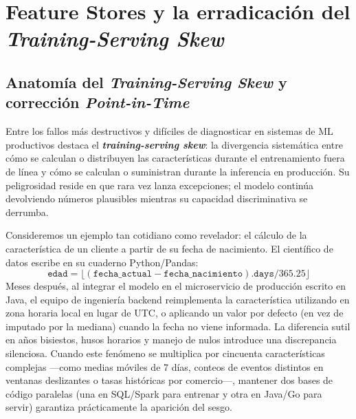 \section[Feature Stores y Training-Serving Skew]{Feature Stores y la erradicación del \textit{Training-Serving Skew}}\label{sec:mlops-feature-stores}

\subsection{Anatomía del \textit{Training-Serving Skew} y corrección \textit{Point-in-Time}}

Entre los fallos más destructivos y difíciles de diagnosticar en sistemas de ML productivos destaca el \textbf{\textit{training-serving skew}}: la divergencia sistemática entre cómo se calculan o distribuyen las características durante el entrenamiento fuera de línea y cómo se calculan o suministran durante la inferencia en producción. Su peligrosidad reside en que rara vez lanza excepciones; el modelo continúa devolviendo números plausibles mientras su capacidad discriminativa se derrumba.

Consideremos un ejemplo tan cotidiano como revelador: el cálculo de la característica  de un cliente a partir de su fecha de nacimiento. El científico de datos escribe en su cuaderno Python/Pandas:
\[
\texttt{edad} = \lfloor (\texttt{fecha\_actual} - \texttt{fecha\_nacimiento}).\texttt{days} / 365.25 \rfloor
\]
Meses después, al integrar el modelo en el microservicio de producción escrito en Java, el equipo de ingeniería backend reimplementa la característica utilizando  en zona horaria local en lugar de UTC, o aplicando un valor por defecto  (en vez de  imputado por la mediana) cuando la fecha no viene informada. La diferencia sutil en años bisiestos, husos horarios y manejo de nulos introduce una discrepancia silenciosa. Cuando este fenómeno se multiplica por cincuenta características complejas ---como medias móviles de 7 días, conteos de eventos distintos en ventanas deslizantes o tasas históricas por comercio---, mantener dos bases de código paralelas (una en SQL/Spark para entrenar y otra en Java/Go para servir) garantiza prácticamente la aparición del sesgo.

